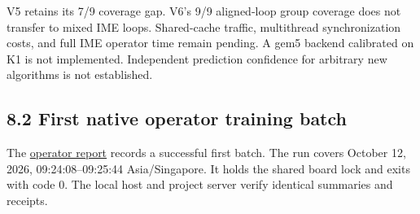 \documentclass[10pt,a4paper]{article}
\begin{document}
V5 retains its 7/9 coverage gap. V6's 9/9 aligned-loop group coverage
does not transfer to mixed IME loops. Shared-cache traffic, multithread
synchronization costs, and full IME operator time remain pending. A gem5
backend calibrated on K1 is not implemented. Independent prediction
confidence for arbitrary new algorithms is not established.

\hypertarget{first-native-operator-training-batch}{%
\subsection{8.2 First native operator training
batch}\label{first-native-operator-training-batch}}

The
\href{https://github.com/MoyaMryia/riscv-accl/blob/main/spacemit/reports/2026-10-12-k1-operator-data.md}{operator
report} records a successful first batch. The run covers October 12,
2026, 09:24:08--09:25:44 Asia/Singapore. It holds the shared board lock
and exits with code 0. The local host and project server verify
identical summaries and receipts.
\end{document}
